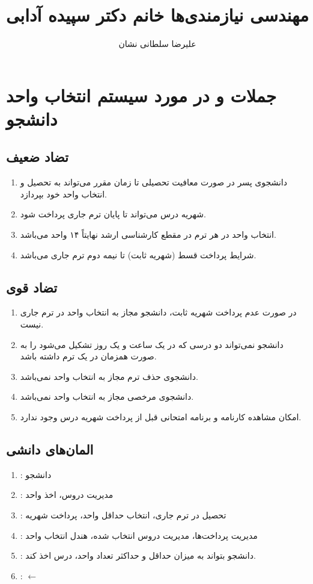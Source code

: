 \documentclass[a4paper]{article}
\title{مهندسی نیازمندی‌ها خانم دکتر سپیده آدابی}
\author{علیرضا سلطانی نشان}
\begin{document}
\maketitle
\section*{جملات  و  در مورد سیستم انتخاب
واحد دانشجو}

\subsection*{تضاد ضعیف}

\begin{enumerate}
    \item دانشجوی پسر در صورت معافیت تحصیلی تا زمان مقرر می‌تواند به تحصیل و
    انتخاب واحد خود بپردازد.
    \item شهریه درس می‌تواند تا پایان ترم جاری پرداخت شود.
    \item انتخاب واحد در هر ترم در مقطع کارشناسی ارشد نهایتاً ۱۴ واحد می‌باشد.
    \item شرایط پرداخت قسط (شهریه ثابت) تا نیمه دوم ترم جاری می‌باشد.
\end{enumerate}

\subsection*{تضاد قوی}

\begin{enumerate}
    \item در صورت عدم پرداخت شهریه ثابت، دانشجو مجاز به انتخاب واحد در ترم جاری
    نیست.
    \item دانشجو نمی‌تواند دو درسی که در یک ساعت و یک روز تشکیل می‌شود را به
    صورت همزمان در یک ترم داشته باشد.
    \item دانشجوی حذف ترم مجاز به انتخاب واحد نمی‌باشد.
    \item دانشجوی مرخصی مجاز به انتخاب واحد نمی‌باشد.
    \item امکان مشاهده کارنامه و برنامه امتحانی قبل از پرداخت شهریه درس وجود
    ندارد.
\end{enumerate}

\subsection*{المان‌های دانشی}

\begin{enumerate}
    \item {}: دانشجو
    \item {}: مدیریت دروس، اخذ واحد
    \item {}: تحصیل در ترم جاری، انتخاب حداقل واحد، پرداخت شهریه
    \item {}: مدیریت پرداخت‌ها، مدیریت دروس انتخاب شده، هندل انتخاب واحد
    \item {}: دانشجو بتواند به میزان حداقل و حداکثر تعداد واحد،
    درس اخذ کند.
    \item {}:  $\leftarrow$
\end{enumerate}
\end{document}
